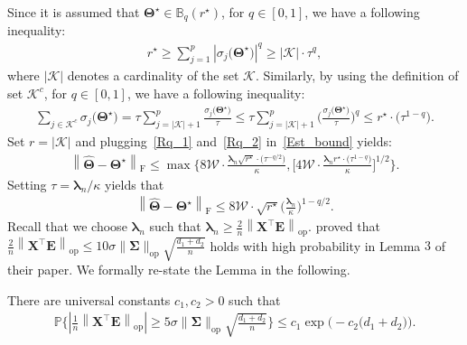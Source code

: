 \documentclass[alpha-refs]{wiley-article}
\begin{document}
Since it is assumed that $\boldsymbol{\Theta}^{\star}\in\mathbb{B}_{q}(r^{\star})$, for $q\in[0,1]$, we have a following inequality:
\begin{align} \label{Rq_1}
    r^{\star} \geq \sum_{j=1}^{p} \left| \sigma_{j}\big(\boldsymbol{\Theta}^{\star} \big) \right|^{q}
    \geq \left| \mathcal{K} \right| \cdot \tau^{q},
\end{align}
where $\left| \mathcal{K} \right|$ denotes a cardinality of the set $\mathcal{K}$.
Similarly, by using the definition of set $\mathcal{K}^{c}$, for $q\in[0,1]$, we have a following inequality:
\begin{align} \label{Rq_2}
    \sum_{j\in \mathcal{K}^{c}}\sigma_{j}\big(\boldsymbol{\Theta^{\star}}\big)
    = \tau \sum_{j = |\mathcal{K}|+1}^{p} \frac{\sigma_{j}\big(\boldsymbol{\Theta^{\star}}\big)}{\tau}
    \leq \tau \sum_{j = |\mathcal{K}|+1}^{p} \bigg(\frac{\sigma_{j}\big(\boldsymbol{\Theta^{\star}}\big)}{\tau}\bigg)^{q}
    \leq r^{\star} \cdot \big(\tau^{1-q}\big).
\end{align}
Set $r=|\mathcal{K}|$ and plugging~\eqref{Rq_1} and~\eqref{Rq_2} in~\eqref{Est_bound} yields:
\begin{align} \label{Est_bound_1}
    \left\| \widehat{\boldsymbol{\Theta}} - \boldsymbol{\Theta^{\star}} \right\|_{\text{F}}
    \leq \max\bigg\{ 8\mathcal{W} \cdot \frac{\boldsymbol{\lambda}_{n}\sqrt{r^{\star}} \cdot \big(\tau^{-q/2}\big)}{\kappa},
    \bigg[  4 \mathcal{W} \cdot \frac{\boldsymbol{\lambda}_{n}r^{\star} \cdot \big(\tau^{1-q}\big)}{\kappa}  \bigg]^{1/2}
    \bigg\}.
\end{align}
Setting $\tau=\boldsymbol{\lambda}_{n}/\kappa$ yields that
\begin{align} \label{Est_bound_2}
    \left\| \widehat{\boldsymbol{\Theta}} - \boldsymbol{\Theta^{\star}} \right\|_{\text{F}}
    \leq 8\mathcal{W} \cdot \sqrt{r^{\star}} \bigg(\frac{\boldsymbol{\lambda}_{n}}{\kappa}\bigg)^{1-q/2}.
\end{align}
Recall that we choose $\boldsymbol{\lambda}_{n}$ such that  $\boldsymbol{\lambda}_{n}\geq\frac{2}{n}\left\|\boldsymbol{X}^{\top}\boldsymbol{E} \right\|_{\text{op}}$.
\citet{negahban2011estimation} proved that $\frac{2}{n}\left\|\boldsymbol{X}^{\top}\boldsymbol{E} \right\|_{\text{op}}\leq 10 \sigma \|\boldsymbol{\Sigma}\|_{\text{op}} \sqrt{\frac{d_{1}+d_{2}}{n}} $ holds with high probability in Lemma $3$ of their paper.
We formally re-state the Lemma in the following.
\begin{lemma}
There are universal constants $c_{1},c_{2}>0$ such that
\begin{align*}
    \mathbb{P}\Bigg\{ \left|\frac{1}{n} \left\| \boldsymbol{X}^{\top}\boldsymbol{E} \right\|_{\text{op}} \right|
    \geq 5 \sigma \|\boldsymbol{\Sigma}\|_{\text{op}} \sqrt{\frac{d_{1}+d_{2}}{n}}  \Bigg\} \leq c_{1} \exp \Big( -c_{2} \big(d_{1}+d_{2}\big) \Big).
\end{align*}
\end{lemma}
\end{document}
